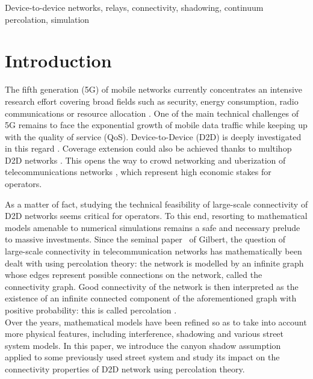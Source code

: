 \documentclass[conference]{IEEEtran}
\begin{document}
\begin{IEEEkeywords}
Device-to-device networks, relays, connectivity, shadowing, continuum percolation, simulation
\end{IEEEkeywords}

\section{Introduction}
The fifth generation (5G) of mobile networks currently concentrates an
intensive research effort covering broad fields such as security,
energy consumption, radio communications or resource allocation
\cite{andrews2014will, boccardi2014five,wang2014cellular}. One of the main technical challenges of 5G remains to
face the exponential growth of mobile data traffic while keeping up
with the quality of service (QoS). Device-to-Device (D2D) is deeply
investigated in this regard \cite{tehrani2014device}. Coverage extension could
also be achieved thanks to multihop D2D networks \cite{lin2013comprehensive}. This
opens the way to crowd networking and uberization of telecommunications networks \cite{asadi2014survey}, which represent high economic stakes for operators. 

As a matter of fact, studying the technical feasibility of
large-scale connectivity of D2D networks seems critical for
operators. To this end, resorting to mathematical models amenable to
numerical simulations remains a safe and necessary prelude to massive
investments. Since the seminal paper~\cite{gilbert1961random} of Gilbert, the
question of large-scale connectivity in telecommunication networks has mathematically been dealt with using percolation theory: the network is modelled by an infinite  graph whose edges represent possible connections on the network, called the connectivity graph. Good connectivity of the network is then interpreted as the existence of an infinite connected component of the aforementioned graph with positive probability: this is called percolation \cite{grimmett1999percolation, meester_continuum_1996}. \\
\indent Over the years, mathematical models have been refined so as
to take into account more physical features,
including  interference, shadowing and  various street system models. 
In this paper, we introduce the canyon shadow assumption applied to some 
previously used street system and study its impact on the
connectivity properties of D2D network using percolation theory.
\end{document}
